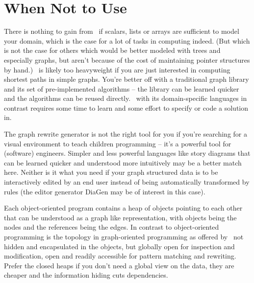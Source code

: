 \section{When Not to Use \GrG}
There is nothing to gain from \GrG\ if scalars, lists or arrays are sufficient to model your domain,
which is the case for a lot of tasks in computing indeed.
(But which is not the case for others which would be better modeled with trees and especially graphs,
but aren't because of the cost of maintaining pointer structures by hand.)
\GrG\ is likely too heavyweight if you are just interested in computing shortest paths in simple graphs.
You're better off with a traditional graph library and its set of pre-implemented algorithms --
the library can be learned quicker and the algorithms can be reused directly.
\GrG\ with its domain-specific languages in contrast requires some time to learn and some effort to specify or code a solution in.

The graph rewrite generator is not the right tool for you if you're searching for a visual environment to teach children programming -- it's a powerful tool for (software) engineers.
Simpler and less powerful languages like story diagrams\cite{storydiagrams} that can be learned quicker and understood more intuitively may be a better match here.
Neither is it what you need if your graph structured data is to be interactively edited by an end user instead of being automatically transformed by rules (the editor generator DiaGen\cite{diagen} may be of interest in this case).

Each object-oriented program contains a heap of objects pointing to each other that can be understood as a graph like representation, with objects being the nodes and the references being the edges.
In contrast to object-oriented programming is the topology in graph-oriented programming as offered by \GrG\ not hidden and encapsulated in the objects, but globally open for inspection and modification, open and readily accessible for pattern matching and rewriting.
Prefer the closed heaps if you don't need a global view on the data, they are cheaper and the information hiding cuts dependencies.




